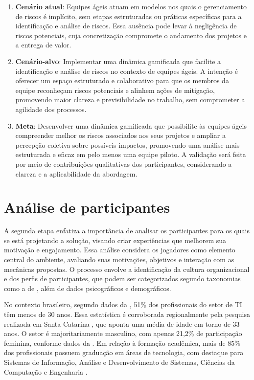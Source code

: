 \documentclass[
	12pt,
	openright,
	twoside,
	a4paper,
	english,
	brazil
	]{abntex2}
\begin{document}
\begin{enumerate}
  \item \textbf{Cenário atual}: Equipes ágeis atuam em modelos nos quais o gerenciamento de riscos é implícito, sem etapas estruturadas ou práticas específicas para a identificação e análise de riscos. Essa ausência pode levar à negligência de riscos potenciais, cuja concretização compromete o andamento dos projetos e a entrega de valor.
  
  \item \textbf{Cenário-alvo}: Implementar uma dinâmica gamificada que facilite a identificação e análise de riscos no contexto de equipes ágeis. A intenção é oferecer um espaço estruturado e colaborativo para que os membros da equipe reconheçam riscos potenciais e alinhem ações de mitigação, promovendo maior clareza e previsibilidade no trabalho, sem comprometer a agilidade dos processos.
  
  \item \textbf{Meta}: Desenvolver uma dinâmica gamificada que possibilite às equipes ágeis compreender melhor os riscos associados aos seus projetos e ampliar a percepção coletiva sobre possíveis impactos, promovendo uma análise mais estruturada e eficaz em pelo menos uma equipe piloto. A validação será feita por meio de contribuições qualitativas dos participantes, considerando a clareza e a aplicabilidade da abordagem.
\end{enumerate}

\section{Análise de participantes}

A segunda etapa enfatiza a importância de analisar os participantes para os quais se está projetando a solução, visando criar experiências que melhorem sua motivação e engajamento. Essa análise considera os jogadores como elemento central do ambiente, avaliando suas motivações, objetivos e interação com as mecânicas propostas. O processo envolve a identificação da cultura organizacional e dos perfis de participantes, que podem ser categorizados segundo taxonomias como a de , além de dados psicográficos e demográficos.

No contexto brasileiro, segundo dados da , 51\% dos profissionais do setor de TI têm menos de 30 anos. Essa estatística é corroborada regionalmente pela pesquisa realizada em Santa Catarina \cite{acate}, que aponta uma média de idade em torno de 33 anos. O setor é majoritariamente masculino, com apenas 21,2\% de participação feminina, conforme dados da . Em relação à formação acadêmica, mais de 85\% dos profissionais possuem graduação em áreas de tecnologia, com destaque para Sistemas de Informação, Análise e Desenvolvimento de Sistemas, Ciências da Computação e Engenharia \cite{revelo2021tecnologia}.
\end{document}
